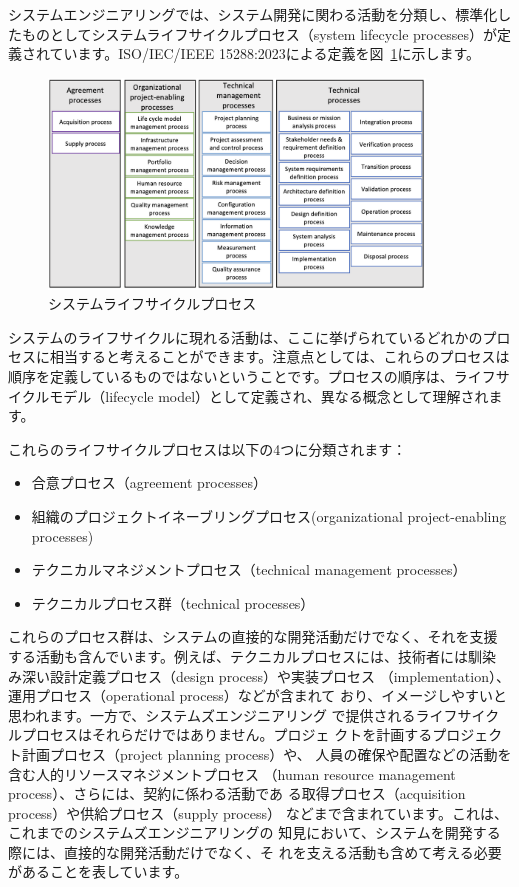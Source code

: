 システムエンジニアリングでは、システム開発に関わる活動を分類し、標準化したものとしてシステムライフサイクルプロセス（system lifecycle processes）が定義されています。ISO/IEC/IEEE 15288:2023による定義を図~\ref{figure:ch4-2}に示します。
\begin{figure}
    \begin{center}
    \includegraphics[width=100mm,bb=0 0 756 424]{safety_assurance_contents/ch4images/fig2.png}
    \caption{システムライフサイクルプロセス}
    \label{figure:ch4-2}
    \end{center}
\end{figure}

システムのライフサイクルに現れる活動は、ここに挙げられているどれかのプロセスに相当すると考えることができます。注意点としては、これらのプロセスは順序を定義しているものではないということです。プロセスの順序は、ライフサイクルモデル（lifecycle model）として定義され、異なる概念として理解されます。

これらのライフサイクルプロセスは以下の4つに分類されます：

\begin{itemize}
    \item 合意プロセス（agreement processes）
    \item 組織のプロジェクトイネーブリングプロセス(organizational project-enabling processes)
    \item テクニカルマネジメントプロセス（technical management processes）
    \item テクニカルプロセス群（technical processes）
\end{itemize}

これらのプロセス群は、システムの直接的な開発活動だけでなく、それを支援
する活動も含んでいます。例えば、テクニカルプロセスには、技術者には馴染
み深い設計定義プロセス（design process）や実装プロセス
（implementation）、運用プロセス（operational process）などが含まれて
おり、イメージしやすいと思われます。一方で、システムズエンジニアリング
で提供されるライフサイクルプロセスはそれらだけではありません。プロジェ
クトを計画するプロジェクト計画プロセス（project planning process）や、
人員の確保や配置などの活動を含む人的リソースマネジメントプロセス
（human resource management process）、さらには、契約に係わる活動であ
る取得プロセス（acquisition process）や供給プロセス（supply process）
などまで含まれています。これは、これまでのシステムズエンジニアリングの
知見において、システムを開発する際には、直接的な開発活動だけでなく、そ
れを支える活動も含めて考える必要があることを表しています。

